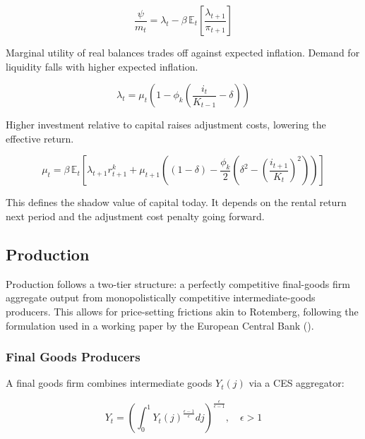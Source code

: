 \documentclass[11pt,preprint]{elsarticle}
\numberwithin{equation}{section}
\numberwithin{figure}{section}
\numberwithin{table}{section}
\begin{document}
\begin{equation}\label{foc_M}
\dfrac{\psi}{m_t} = \lambda_t - \beta \, \mathbb{E}_t \left[ \dfrac{\lambda_{t+1}}{\pi_{t+1}} \right]
\end{equation}

Marginal utility of real balances trades off against expected inflation.
Demand for liquidity falls with higher expected inflation.

\begin{equation}\label{foc_I}
\lambda_t = \mu_t \left( 1 - \phi_k \left( \frac{i_t}{K_{t-1}} - \delta \right) \right)
\end{equation}

Higher investment relative to capital raises adjustment costs, lowering
the effective return.

\begin{equation}\label{foc_K}
\mu_t = \beta \, \mathbb{E}_t \left[ \lambda_{t+1} r^k_{t+1} + \mu_{t+1} \left( (1-\delta) - \frac{\phi_k}{2} \left( \delta^2 - \left( \frac{i_{t+1}}{K_t} \right)^2 \right) \right) \right]
\end{equation}

This defines the shadow value of capital today. It depends on the rental
return next period and the adjustment cost penalty going forward.

\subsection{Production}\label{production}

Production follows a two-tier structure: a perfectly competitive
final-goods firm aggregate output from monopolistically competitive
intermediate-goods producers. This allows for price-setting frictions
akin to Rotemberg, following the formulation used in a working paper by
the European Central Bank ().

\subsubsection{Final Goods Producers}\label{final-goods-producers}

A final goods firm combines intermediate goods \(Y_t(j)\) via a CES
aggregator:

\begin{equation}  
Y_t = \left( \int_0^1 Y_t(j)^{\frac{\epsilon-1}{\epsilon}}  dj \right)^{\frac{\epsilon}{\epsilon-1}}, \quad \epsilon > 1  
\label{ces_production}  
\end{equation}
\end{document}
